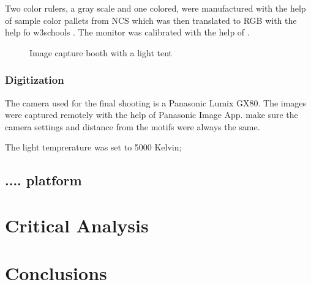 \documentclass[12 pt]{paper}
\begin{document}
Two color rulers, a gray scale and one colored,  were manufactured with the help of sample color pallets from NCS which was then translated to RGB with the help fo w3schools \autocite[]{w3}. The monitor was calibrated with the help of \textcite[]{koch2007}. 


\begin{figure}[!htb]
	\centering
	\caption[short:]{Image capture booth with a light tent}
	\label{ruler}
\end{figure}



\subsubsection{Digitization}

  The camera used for the final shooting is a Panasonic Lumix GX80. The images were captured remotely with the help of Panasonic Image App. make sure the camera settings and distance from the motifs were always the same. 
 
 The light temprerature was set to 5000 Kelvin;

\subsection{.... platform}%

\section {Critical Analysis}


\section{Conclusions}


\newpage

%
%
\printbibliography
\end{document}
